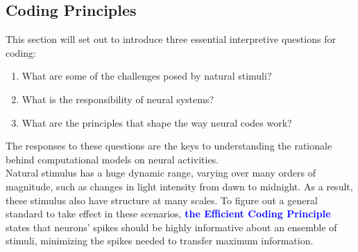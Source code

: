 \documentclass[11pt]{article}
\begin{document}
\subsection{Coding Principles}
This section will set out to introduce three essential interpretive questions for coding: 
\begin{enumerate}
    \item What are some of the challenges posed by natural stimuli?
    \item What is the responsibility of neural systems?
    \item What are the principles that shape the way neural codes work?
\end{enumerate}
The responses to these questions are the keys to understanding the rationale behind computational models on neural activities.
\\

Natural stimulus has a huge dynamic range, varying over many orders of magnitude, such as changes in light intensity from dawn to midnight. As a result, these stimulus also have structure at many scales. To figure out a general standard to take effect in these scenarios, \textcolor{Blue}{\textbf{the Efficient Coding Principle}} states that neurons' spikes should be highly informative about an ensemble of stimuli, minimizing the spikes needed to transfer maximum information.
\\
\end{document}
